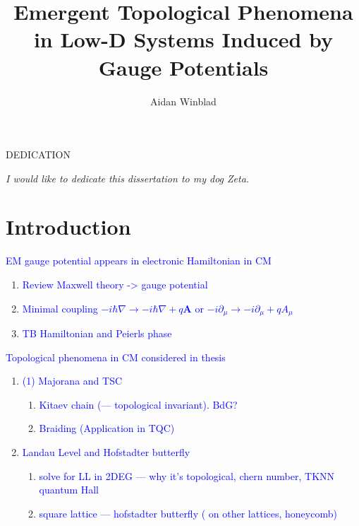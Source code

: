 \documentclass[12pt,doctor]{thesis}
\title{Emergent Topological Phenomena in Low-D Systems Induced by Gauge Potentials}
\author{Aidan Winblad}
\newcommand{\Blue}[1]{\textcolor{blue}{#1}}
\renewcommand{\vec}[1]{\mathbf{#1}}
\newcommand{\MN}{\mathcal{M}}
\begin{document}
\frontmatter

\maketitle              %
\makemycopyright        %
\makeabstract           %
\makeacknowledgements   %

\begin{flatcenter} %

    DEDICATION

    \vfill %

    \noindent \textit{I would like to dedicate this dissertation to my dog Zeta.}
    \vfill %
\end{flatcenter}
\newpage

\tableofcontents    %
\listoftables       %
\listoffigures      %

\mainmatter %

\chapter{Introduction}
\Blue{EM gauge potential appears in electronic Hamiltonian in CM}
\begin{enumerate}
  \item \Blue{Review Maxwell theory -> gauge potential}
  \item \Blue{Minimal coupling $-i \hbar \nabla \rightarrow -i \hbar \nabla + q \vec{A}$ or $-i\partial_{\mu} \rightarrow -i\partial_{\mu} + qA_{\mu}$}
  \item \Blue{TB Hamiltonian and Peierls phase}
\end{enumerate}

\Blue{Topological phenomena in CM considered in thesis}
\begin{enumerate}
  \item \Blue{(1) Majorana and TSC}
  \begin{enumerate}[i]
    \item \Blue{Kitaev chain (\MN --- topological invariant). BdG?}
    \item \Blue{Braiding (Application in TQC)}
  \end{enumerate}
  \item \Blue{Landau Level and Hofstadter butterfly}
  \begin{enumerate}[i]
    \item \Blue{solve for LL in 2DEG --- why it's topological, chern number, TKNN quantum Hall}
    \item \Blue{square lattice --- hofstadter butterfly ( on other lattices, honeycomb)}
  \end{enumerate}
\end{enumerate}
\end{document}
